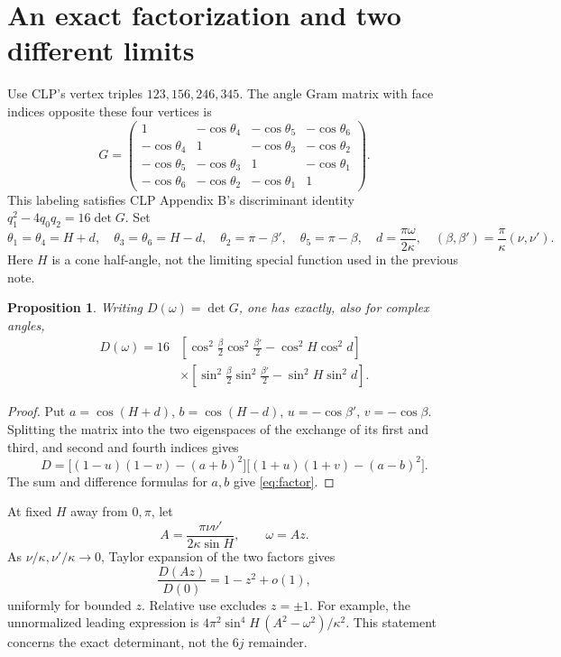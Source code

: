 \documentclass[11pt,a4paper]{article}
\newtheorem{proposition}{Proposition}
\begin{document}
\section{An exact factorization and two different limits}
Use CLP's vertex triples \(123,156,246,345\). The angle Gram matrix
with face indices opposite these four vertices is
\begin{equation}
 G=\begin{pmatrix}
 1&-\cos\theta_4&-\cos\theta_5&-\cos\theta_6\\
 -\cos\theta_4&1&-\cos\theta_3&-\cos\theta_2\\
 -\cos\theta_5&-\cos\theta_3&1&-\cos\theta_1\\
 -\cos\theta_6&-\cos\theta_2&-\cos\theta_1&1
 \end{pmatrix}. \label{eq:gram}
\end{equation}
This labeling satisfies CLP Appendix B's discriminant identity
\(q_1^2-4q_0q_2=16\det G\).
Set
\[
 \theta_1=\theta_4=H+d,\quad \theta_3=\theta_6=H-d,\quad
 \theta_2=\pi-\beta',\quad\theta_5=\pi-\beta,
 \quad d=\frac{\pi\omega}{2\kappa},\quad
 (\beta,\beta')=\frac{\pi}{\kappa}(\nu,\nu').
\]
Here \(H\) is a cone half-angle, not the limiting special function
used in the previous note.

\begin{proposition}
Writing \(D(\omega)=\det G\), one has exactly, also for complex angles,
\begin{align}
 D(\omega)=16&
 \left[\cos^2\frac\beta2\cos^2\frac{\beta'}2-\cos^2H\cos^2d\right]
 \nonumber\\[-2pt]
 &\times
 \left[\sin^2\frac\beta2\sin^2\frac{\beta'}2-\sin^2H\sin^2d\right].
 \label{eq:factor}
\end{align}
\end{proposition}
\begin{proof}
Put \(a=\cos(H+d)\), \(b=\cos(H-d)\), \(u=-\cos\beta'\),
\(v=-\cos\beta\). Splitting the matrix into the two eigenspaces of
the exchange of its first and third, and second and fourth indices gives
\[
 D=\big[(1-u)(1-v)-(a+b)^2\big]
    \big[(1+u)(1+v)-(a-b)^2\big].
\]
The sum and difference formulas for \(a,b\) give \eqref{eq:factor}.
\end{proof}

At fixed \(H\) away from \(0,\pi\), let
\[
 A=\frac{\pi\nu\nu'}{2\kappa\sin H},\qquad \omega=A z.
\]
As \(\nu/\kappa,\nu'/\kappa\to0\), Taylor expansion of the two
factors gives
\begin{equation}
 \frac{D(Az)}{D(0)}=1-z^2+o(1), \label{eq:fixed}
\end{equation}
uniformly for bounded \(z\). Relative use excludes \(z=\pm1\).
For example, the unnormalized leading expression is
\(4\pi^2\sin^4H\,(A^2-\omega^2)/\kappa^2\).
This statement concerns the exact determinant, not the \(6j\) remainder.
\end{document}

